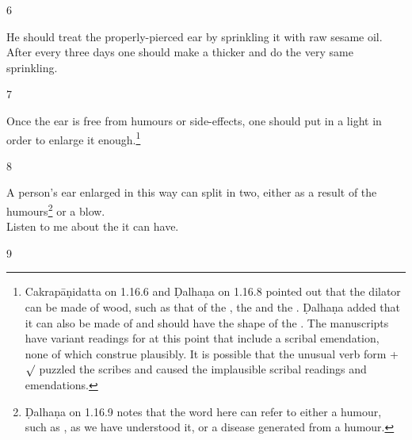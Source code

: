 \begin{translation}
\item[6] 
    
He should treat the properly-pierced ear by sprinkling it with raw sesame
oil.   After every three days one should make a thicker  and
do the very same sprinkling.
    
\item[7] 
    
Once the ear is free from humours or side-effects, one should put in a light
 in order to enlarge it enough.\footnote{Cakrapāṇidatta
    on 1.16.6 \citep[127]{acar-1939} and Ḍalhaṇa on 1.16.8 \citep[77]{vulgate} pointed
    out that the dilator can be made of wood, such as that of the
    , the  
    and the
    . Ḍalhaṇa added that it can also be made of
     and should have the shape of the 
    . The manuscripts have variant readings for  at this point that include a scribal
    emendation, none of which construe plausibly. It is possible that the unusual
    verb form +$\surd$ puzzled the scribes and caused 
    the implausible scribal readings and emendations.} 
    
\item[8]
    
\begin{sloka}
A person's ear enlarged in this way can split in two, either as a result of the 
humours\footnote{Ḍalhaṇa on 1.16.9  \citep[77]{vulgate} notes that the word  
here can refer to either a humour, such as , as we have 
understood it, or a 
disease generated from a humour.} or a blow.\\ Listen to me about the 
it can have. 
    \end{sloka}
    
\item[9]
    

\end{translation}
